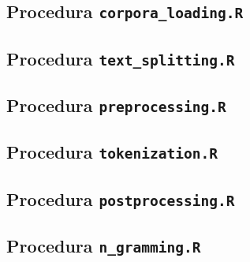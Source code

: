 \subsection{Procedura \texttt{corpora\_loading.R}}




\subsection{Procedura \texttt{text\_splitting.R}}




\subsection{Procedura \texttt{preprocessing.R}}





\subsection{Procedura \texttt{tokenization.R}}




\subsection{Procedura \texttt{postprocessing.R}}




\subsection{Procedura \texttt{n\_gramming.R}}




